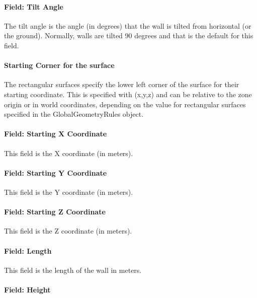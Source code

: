 \paragraph{Field: Tilt Angle}\label{field-tilt-angle-2}

The tilt angle is the angle (in degrees) that the wall is tilted from horizontal (or the ground). Normally, walls are tilted 90 degrees and that is the default for this field.

\paragraph{Starting Corner for the surface}\label{starting-corner-for-the-surface-2}

The rectangular surfaces specify the lower left corner of the surface for their starting coordinate. This is specified with (x,y,z) and can be relative to the zone origin or in world coordinates, depending on the value for rectangular surfaces specified in the GlobalGeometryRules object.

\paragraph{Field: Starting X Coordinate}\label{field-starting-x-coordinate-2}

This field is the X coordinate (in meters).

\paragraph{Field: Starting Y Coordinate}\label{field-starting-y-coordinate-2}

This field is the Y coordinate (in meters).

\paragraph{Field: Starting Z Coordinate}\label{field-starting-z-coordinate-2}

This field is the Z coordinate (in meters).

\paragraph{Field: Length}\label{field-length-2}

This field is the length of the wall in meters.

\paragraph{Field: Height}\label{field-height-2}

